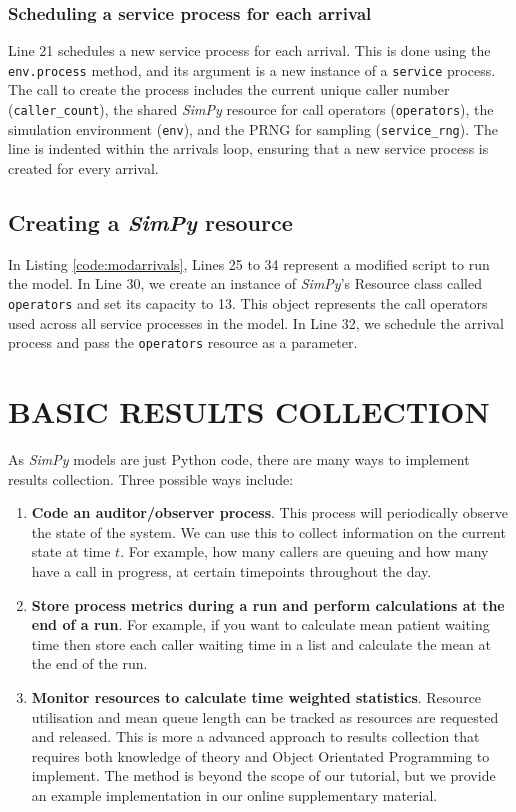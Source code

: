 \documentclass{swpaperproc}
\theoremstyle{sw}
\begin{document}
\subsubsection{Scheduling a service process for each arrival}

Line 21 schedules a new service process for each arrival. This is done using the \verb|env.process| method, and its argument is a new instance of a \verb|service| process. The call to create the process includes the current unique caller number (\verb|caller_count|), the shared \textit{SimPy} resource for call operators (\verb|operators|), the simulation environment (\verb|env|), and the PRNG for sampling (\verb|service_rng|). The line is indented within the arrivals loop, ensuring that a new service process is created for every arrival.

\subsection{Creating a \textit{SimPy} resource}

In Listing \ref{code:modarrivals}, Lines 25 to 34 represent a modified script to run the model.  In Line 30, we create an instance of \textit{SimPy}'s Resource class called \verb|operators| and set its capacity to 13. This object represents the call operators used across all service processes in the model. In Line 32, we schedule the arrival process and pass the \verb|operators| resource as a parameter.


\section{BASIC RESULTS COLLECTION}
\label{sec:results}

As \textit{SimPy} models are just Python code, there are many ways to implement results collection.  Three possible ways include:


\begin{enumerate}
    \item  \textbf{Code an auditor/observer process}.  This process will periodically observe the state of the system. We can use this to collect information on the current state at time $t$. For example, how many callers are queuing and how many have a call in progress, at certain timepoints throughout the day.  
    \item \textbf{Store process metrics during a run and perform calculations at the end of a run}. For example, if you want to calculate mean patient waiting time then store each caller waiting time in a list and calculate the mean at the end of the run.
    \item  \textbf{Monitor resources to calculate time weighted statistics}. Resource utilisation and mean queue length can be tracked as resources are requested and released.  This is more a advanced approach to results collection that requires both knowledge of theory and Object Orientated Programming to implement. The method is beyond the scope of our tutorial, but we provide an example implementation in our online supplementary material.
    
\end{enumerate}
\end{document}
